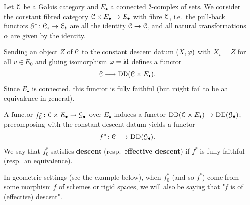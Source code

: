 \begin{defi}
    Let ${\mathcal C}$ be a Galois category and $E_\bullet$ a connected $2$-complex of sets. We consider the constant fibred category ${\mathcal C} \times E_\bullet \to E_\bullet$ with fibre ${\mathcal C}$, i.e.~the pull-back functors $\partial^\ast\colon  {\mathcal C}_s \to {\mathcal C}_t$ are all the identity ${\mathcal C} \to {\mathcal C}$, and all natural transformations $\alpha$ are given by the identity.  
    
    Sending an object $Z$ of ${\mathcal C}$ to the constant descent datum $(X,\varphi)$ with $X_v = Z$ for all $v \in E_0$ and gluing isomorphism $\varphi = \operatorname{id}$ defines a functor
    \[
    {\mathcal C} \longrightarrow \operatorname{DD}({\mathcal C} \times E_\bullet).
    \]
    Since $E_\bullet$ is connected, this functor is fully faithful (but might fail to be an equivalence in general).

    A functor $f_0^\ast\colon  {\mathcal C} \times E_\bullet \to {\mathcal G}_\bullet$ over $E_\bullet$ induces a functor $\operatorname{DD}({\mathcal C} \times E_\bullet) \to \operatorname{DD}({\mathcal G}_\bullet)$; precomposing with the constant descent datum yields a functor
    \[
    f^\ast \colon {\mathcal C} \longrightarrow \operatorname{DD}({\mathcal G}_\bullet).
    \]
    We say that $f_0^\ast$ satisfies \textbf{descent} (resp.\ \textbf{effective descent}) if $f^\ast$ is fully faithful (resp.\ an equivalence).

    In geometric settings (see the example below), when $f_0^*$ (and so $f^*$) come from some morphism $f$ of schemes or rigid spaces, we will also be saying that "$f$ is of (effective) descent".
\end{defi}


